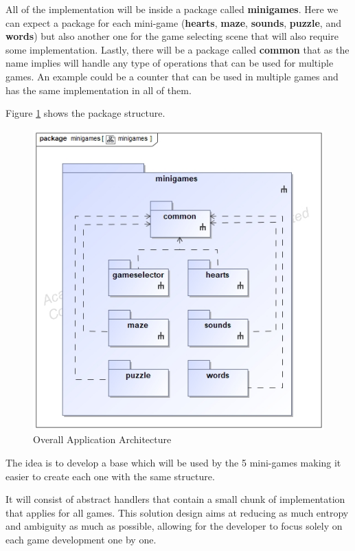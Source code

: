 All of the implementation will be inside a package called \textbf{minigames}. Here we can expect a package for each mini-game (\textbf{hearts}, \textbf{maze}, \textbf{sounds}, \textbf{puzzle}, and \textbf{words}) but also another one for the game selecting scene that will also require some implementation. Lastly, there will be a package called \textbf{common} that as the name implies will handle any type of operations that can be used for multiple games. An example could be a counter that can be used in multiple games and has the same implementation in all of them.


\newpage
Figure \ref{fig:packages} shows the package structure.

\begin{figure}[H]
    \centering
    \includegraphics[scale=.5]{Chapters/arq/class__minigames__minigames.jpg}
    \caption{Overall Application Architecture}
    \label{fig:packages}
\end{figure}

The idea is to develop a base which will be used by the 5 mini-games making it easier to create each one with the same structure. 

It will consist of abstract handlers that contain a small chunk of implementation that applies for all games. This solution design aims at reducing as much entropy and ambiguity as much as possible, allowing for the developer to focus solely on each game development one by one.

